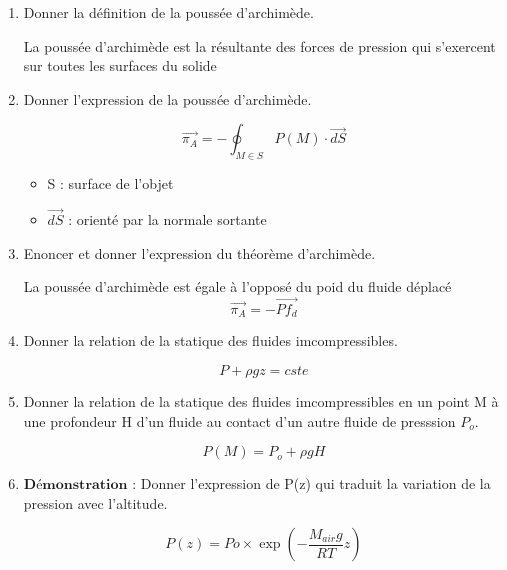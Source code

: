 \begin{enumerate}[label=\arabic{enumi} - , left=0pt, itemsep=1em]
\begin{solution}
           \end{solution}
     
    \item Donner la définition de la poussée d'archimède. \par
    \begin{solution}
        La poussée d'archimède est la résultante des forces de pression qui s'exercent sur toutes les surfaces du solide 
     \end{solution}

     \item Donner l'expression de la poussée d'archimède. \par
     \begin{solution}
         \[ \vec{\pi_A} = -\oint_{M \in S} P(M) \cdot \vec{dS} \]
         \begin{itemize}
          \tiny\item   S : surface de l'objet
          \tiny\item   $\vec{dS}$ : orienté par la normale sortante
      \end{itemize}  
      \end{solution}

      \item Enoncer et donner l'expression du théorème d'archimède. \par
      \begin{solution}
          La poussée d'archimède est égale à l'opposé du poid du fluide déplacé
          \[\vec{\pi_A} = - \overrightarrow{Pf_d} \] 
       \end{solution}

       \item Donner la relation de la statique des fluides imcompressibles. \par
       \begin{solution}
          \[ P + \rho g z = cste\]
        \end{solution}

        \item Donner la relation de la statique des fluides imcompressibles en un point M à une profondeur H d'un fluide au contact d'un autre fluide de presssion $P_o$. \par
        \begin{solution}
           \[P(M) = P_o + \rho g H\]
           
         \end{solution}

         \item $\textbf{Démonstration :}$ Donner l'expression de P(z) qui traduit la variation de la pression avec l'altitude.\par
         \begin{solution}
            \[P(z) = Po \times \exp(- \frac{M_{air}g}{RT}z) \]
            

\end{solution}
\end{enumerate}
